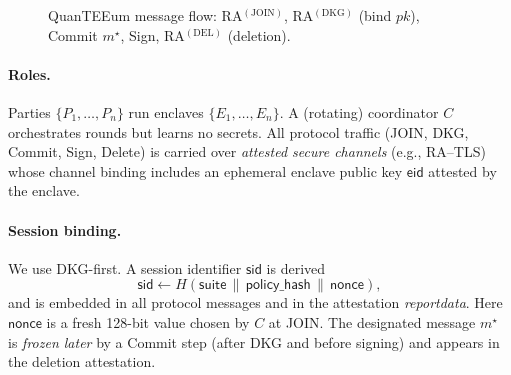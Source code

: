 \documentclass[runningheads,orivec]{llncs}
\newcommand{\RA}{\mathsf{RA}}
\begin{document}
\begin{figure}[!htbp]
\caption{QuanTEEum message flow: RA$^{(\mathrm{JOIN})}$, RA$^{(\mathrm{DKG})}$ (bind $pk$), Commit $m^{\star}$, Sign, RA$^{(\mathrm{DEL})}$ (deletion).}
\label{fig:flow}
\end{figure}

\paragraph{Roles.}
Parties $\{P_1,\dots,P_n\}$ run enclaves $\{E_1,\dots,E_n\}$.
A (rotating) coordinator $C$ orchestrates rounds but learns no secrets.
All protocol traffic (JOIN, DKG, Commit, Sign, Delete) is carried over
\emph{attested secure channels} (e.g., RA--TLS) whose channel binding includes an
ephemeral enclave public key $\mathsf{eid}$ attested by the enclave.

\paragraph{Session binding.}
We use DKG-first. A session identifier $\mathsf{sid}$ is derived
\[
  \mathsf{sid} \gets H(\mathsf{suite}\,\|\,\mathsf{policy\_hash}\,\|\,\mathsf{nonce}),
\]
and is embedded in all protocol messages and in the attestation \emph{reportdata}.
Here $\mathsf{nonce}$ is a fresh 128-bit value chosen by $C$ at JOIN.
The designated message $m^{\star}$ is \emph{frozen later} by a Commit step
(after DKG and before signing) and appears in the deletion attestation.
\end{document}
